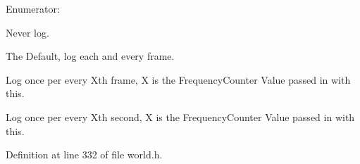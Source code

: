 \begin{Desc}
\item[Enumerator: ]\par
\begin{description}
\item[{\em 
\hypertarget{classphys_1_1World_a8c754464edbb78270fa0ee1e395b963da477724952d47abb95e5addd925fc2ec6}{
LogNever}
\label{classphys_1_1World_a8c754464edbb78270fa0ee1e395b963da477724952d47abb95e5addd925fc2ec6}
}]Never log. \item[{\em 
\hypertarget{classphys_1_1World_a8c754464edbb78270fa0ee1e395b963dafce667b90c7842e6452d09f4954b6fe7}{
LogOncePerFrame}
\label{classphys_1_1World_a8c754464edbb78270fa0ee1e395b963dafce667b90c7842e6452d09f4954b6fe7}
}]The Default, log each and every frame. \item[{\em 
\hypertarget{classphys_1_1World_a8c754464edbb78270fa0ee1e395b963da017fb8da8ff480a3b3190c96cdddde74}{
LogOncePerXFrames}
\label{classphys_1_1World_a8c754464edbb78270fa0ee1e395b963da017fb8da8ff480a3b3190c96cdddde74}
}]Log once per every Xth frame, X is the FrequencyCounter Value passed in with this. \item[{\em 
\hypertarget{classphys_1_1World_a8c754464edbb78270fa0ee1e395b963da5acb020cb6b0f759ecd25c413927be55}{
LogOncePerXSeconds}
\label{classphys_1_1World_a8c754464edbb78270fa0ee1e395b963da5acb020cb6b0f759ecd25c413927be55}
}]Log once per every Xth second, X is the FrequencyCounter Value passed in with this. \end{description}
\end{Desc}



Definition at line 332 of file world.h.



